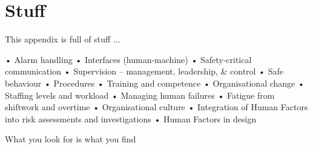 \chapter{Stuff}
This appendix is full of stuff ...







• Alarm handling
• Interfaces (human-machine)
• Safety-critical communication
• Supervision – management, leadership, \& control
• Safe behaviour
• Procedures
• Training and competence
• Organisational change
• Staffing levels and workload
• Managing human failures
• Fatigue from shiftwork and overtime
• Organisational culture
• Integration of Human Factors into risk assessments and investigations
• Human Factors in design


What you look for is what you find